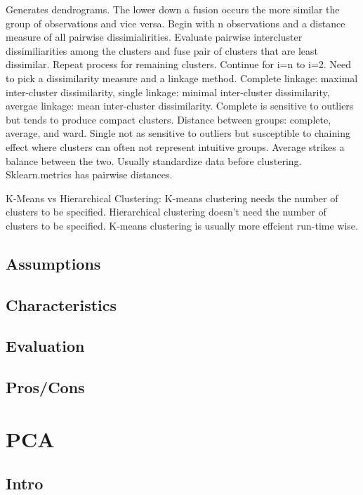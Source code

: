 \documentclass[]{book}
\theoremstyle{definition}
\theoremstyle{definition}
\theoremstyle{definition}
\theoremstyle{remark}
\begin{document}
Generates dendrograms. The lower down a fusion occurs the more similar
the group of observations and vice versa. Begin with n observations and
a distance measure of all pairwise dissimialirities. Evaluate pairwise
intercluster dissimiliarities among the clusters and fuse pair of
clusters that are least dissimilar. Repeat process for remaining
clusters. Continue for i=n to i=2. Need to pick a dissimilarity measure
and a linkage method. Complete linkage: maximal inter-cluster
dissimilarity, single linkage: minimal inter-cluster dissimilarity,
avergae linkage: mean inter-cluster dissimilarity. Complete is sensitive
to outliers but tends to produce compact clusters. Distance between
groups: complete, average, and ward. Single not as sensitive to outliers
but susceptible to chaining effect where clusters can often not
represent intuitive groups. Average strikes a balance between the two.
Usually standardize data before clustering. Sklearn.metrics has pairwise
distances.

K-Means vs Hierarchical Clustering: K-means clustering needs the number
of clusters to be speciﬁed. Hierarchical clustering doesn't need the
number of clusters to be speciﬁed. K-means clustering is usually more
effcient run-time wise.

\subsection{Assumptions}\label{assumptions-4}

\subsection{Characteristics}\label{characteristics-4}

\subsection{Evaluation}\label{evaluation-4}

\subsection{Pros/Cons}\label{proscons-4}

\section{PCA}\label{pca}

\subsection{Intro}\label{intro-5}
\end{document}
